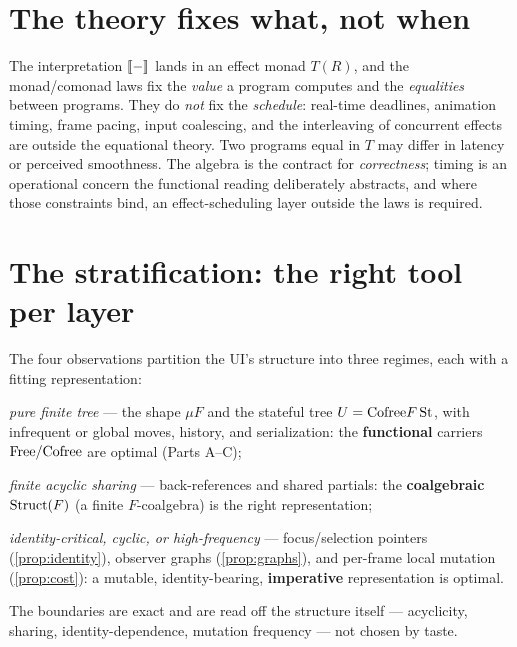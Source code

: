 \documentclass[../uxoxo-main]{subfiles}
\begin{document}
\section{The theory fixes what, not when}\label{sec:when}
\begin{remark}\label{rem:when}
The interpretation $\llbracket - \rrbracket$ lands in an effect monad $T(R)$, and the monad/comonad
laws fix the \emph{value} a program computes and the \emph{equalities} between
programs. They do \emph{not} fix the \emph{schedule}: real-time deadlines, animation
timing, frame pacing, input coalescing, and the interleaving of concurrent effects
are outside the equational theory. Two programs equal in $T$ may differ in latency
or perceived smoothness. The algebra is the contract for \emph{correctness}; timing
is an operational concern the functional reading deliberately abstracts, and where
those constraints bind, an effect-scheduling layer outside the laws is required.
\end{remark}

\section{The stratification: the right tool per layer}\label{sec:strata}
\begin{proposition}\label{prop:strata}
The four observations partition the UI's structure into three regimes, each with a
fitting representation:
\begin{definitionlist}
  \item \emph{pure finite tree} --- the shape $\mu F$ and the stateful tree
        $U=\mathrm{Cofree} F\,\mathrm{St}$, with infrequent or global moves, history, and
        serialization: the \textbf{functional} carriers $\mathrm{Free}/\mathrm{Cofree}$ are optimal
        (Parts A--C);
  \item \emph{finite acyclic sharing} --- back-references and shared partials: the
        \textbf{coalgebraic} $\mathrm{Struct}(F)$ (a finite $F$-coalgebra) is the right
        representation;
  \item \emph{identity-critical, cyclic, or high-frequency} --- focus/selection
        pointers (\cref{prop:identity}), observer graphs (\cref{prop:graphs}),
        and per-frame local mutation (\cref{prop:cost}): a mutable,
        identity-bearing, \textbf{imperative} representation is optimal.
\end{definitionlist}
The boundaries are exact and are read off the structure itself --- acyclicity,
sharing, identity-dependence, mutation frequency --- not chosen by taste.
\end{proposition}
\end{document}
